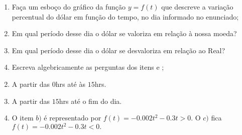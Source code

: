 \documentclass[10 pt,usenames,dvipsnames, oneside]{article}
\begin{document}
\begin{enumerate}

\item{} Faça um esboço do gráfico da função $y = f(t)$ que descreve a variação percentual do dólar em função do tempo, no dia informado no enunciado;

\item{} Em qual período desse dia o dólar se valoriza em relação à nossa moeda? 

\item{} Em qual período desse dia o dólar se desvaloriza em relação ao Real?

\item{} Escreva algebricamente as perguntas dos itens  e ;

\end{enumerate}

\ifdefined\prof
\begin{solucao}

\begin{enumerate}\setcounter{enumi}{1}
\item A partir das $0$hrs até às $15$hrs.
\item A partir das $15$hrs até o fim do dia.
\item O item $b)$ é representado por $f(t)=-0.002t^2-0.3t>0.$ O $c)$ fica $f(t)=-0.002t^2-0.3t<0. $
\end{enumerate}

\end{solucao}
\fi
\end{document}
